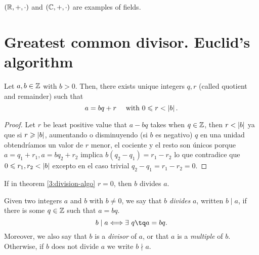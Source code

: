 \begin{example}
    $\left( \mathbb{R}, +, \cdot \right) $ and $\left( \mathbb{C}, +, \cdot \right) $ are examples of fields.
\end{example}


\section{Greatest common divisor. Euclid's algorithm}

\begin{theorem} \label{3:division-algo}
    Let $a, b\in\mathbb{Z}$ with $b > 0$. Then, there exists unique
    integers $q, r$ (called quotient and remainder) such that
    \begin{equation}
        a = bq + r\quad\textrm{ with } 0\leqslant r < \left\vert b \right\vert.
    \end{equation}
\end{theorem}

\begin{proof}
    Let $r$ be least positive value that $a - bq$ takes when $q\in\mathbb{Z}$, then $r < \left\vert b \right\vert$ ya que si $r \geqslant
    \left\vert b \right\vert$, aumentando o disminuyendo (si $b$ es negativo) $q$ en una unidad obtendríamos un valor de $r$
    menor, el cociente y el resto son únicos porque $a = q_1 + r_1, a = bq_2 + r_2$ implica $b\left( q_2 - q_1
    \right) = r_1 - r_2$ lo que contradice que $0 \leqslant r_1, r_2 < \left\vert b \right\vert$ excepto en el caso trivial $q_2 - q_1
    = r_1 - r_2 = 0$.
\end{proof}

If in theorem \ref{3:division-algo} $r = 0$, then $b$ divides $a$.

\begin{defi}[Divisibility] \label{3:divisibility}
    Given two integers $a$ and $b$ with $b\neq 0$, we say that $b$ \textit{divides}
    $a$, written $b\mid a$, if there is some $q\in\mathbb{Z}$ such that $a = bq$.
    \begin{equation}
        b\mid a\iff \exists\ q\tq a = bq.
    \end{equation}
    Moreover, we also say that $b$ is a \textit{divisor} of $a$, or that $a$ is a \textit{multiple} of $b$.
    Otherwise, if $b$ does not divide $a$ we write $b \nmid a$.

\end{defi}

